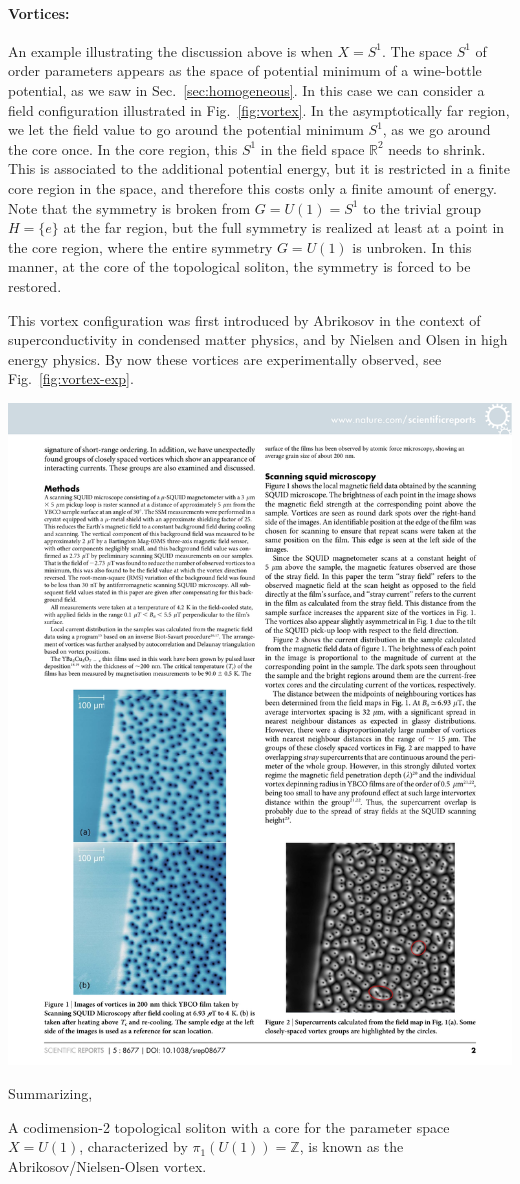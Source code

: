 \documentclass[12pt]{article}
\numberwithin{equation}{section}
\theoremstyle{remark}
\renewenvironment{figure}[1][]{
  \begin{originalfigure}[#1]
    \begin{mdframed}[linecolor=black!0,backgroundcolor=black!1]
}{
    \end{mdframed}
  \end{originalfigure}
}
\def\bR{\mathbb{R}}
\def\bZ{\mathbb{Z}}
\begin{document}
\paragraph{Vortices:}
An example illustrating the discussion above is when $X=S^1$.
The space $S^1$ of order parameters appears as the space of potential minimum of a wine-bottle potential, as we saw in Sec.~\ref{sec:homogeneous}.
In this case we can consider a field configuration illustrated in Fig.~\ref{fig:vortex}.
In the asymptotically far region, we let the field value  to go around the potential minimum $S^1$,
as we go around the core once. 
In the core region, this $S^1$ in the field space $\bR^2$ needs to shrink. 
This is associated to the additional potential energy, but it is restricted in a finite core region in the space,
and therefore this costs only a finite amount of energy.
Note that the symmetry is broken from $G=U(1)=S^1$ to the trivial group $H=\{e\}$ at the far region,
but the full symmetry is realized at least at a point in the core region,
where the entire  symmetry $G=U(1)$ is unbroken.
In this manner, at the core of the topological soliton, the symmetry is forced to be restored. 




This vortex configuration was first introduced by Abrikosov \cite{Abrikosov:1956sx} in the context of superconductivity 
in condensed matter physics,
and by Nielsen and Olsen \cite{Nielsen:1973cs} in high energy physics. 
By now these vortices are experimentally observed, see Fig.~\ref{fig:vortex-exp}.
\begin{figure}[h]
\centering
\includegraphics[width=.5\textwidth]{vortices.pdf}
\caption{A scanning SQUID-microscope view of the vortices in a superconducting material.
Taken from \cite{VortexExp}.}
\label{fig:vortex-exp}
\end{figure}
Summarizing, 
\begin{example}
A codimension-2 topological soliton with a core for the parameter space $X=U(1)$,
characterized by $\pi_1(U(1))=\bZ$,
is known as the Abrikosov/Nielsen-Olsen vortex.
\end{example}
\end{document}
